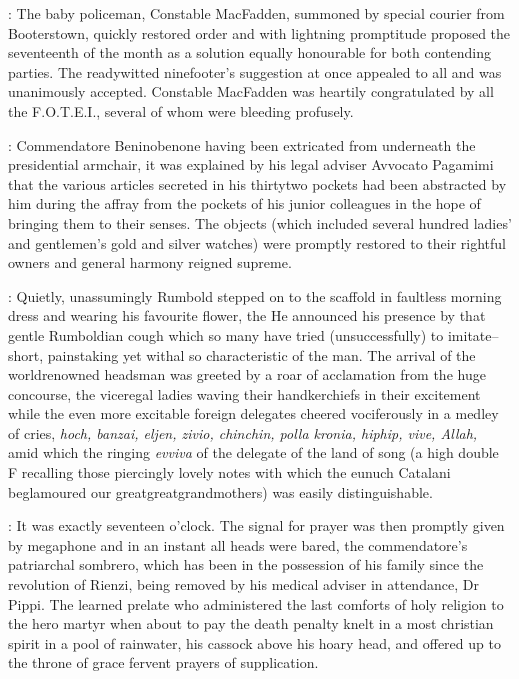 :
The baby policeman,
Constable MacFadden,
summoned by special courier from
Booterstown,
quickly restored order and with lightning promptitude
proposed the seventeenth of the month
as a solution equally honourable for
both contending parties.
The readywitted ninefooter's suggestion at once
appealed to all and was unanimously accepted.
Constable MacFadden was
heartily congratulated by all the F.O.T.E.I.,
several of whom were
bleeding profusely.

:
Commendatore Beninobenone having been extricated
from underneath the presidential armchair,
it was explained by his legal
adviser Avvocato Pagamimi that the various articles secreted in his
thirtytwo pockets had been abstracted by him during the affray from the
pockets of his junior colleagues in the hope of bringing them to their
senses.
The objects (which included several hundred ladies' and
gentlemen's gold and silver watches)
were promptly restored to their
rightful owners and general harmony reigned supreme.

:
Quietly,
unassumingly Rumbold stepped on to the scaffold in faultless
morning dress and wearing his favourite flower,
the 
He announced his presence by that gentle Rumboldian cough which so
many have tried (unsuccessfully) to imitate--short,
painstaking yet withal
so characteristic of the man.
The arrival of the worldrenowned headsman
was greeted by a roar of acclamation from the huge concourse,
the
viceregal ladies waving their handkerchiefs in their excitement while the
even more excitable foreign delegates cheered vociferously in a medley of
cries,
\emph{hoch,
banzai,
eljen,
zivio,
chinchin,
polla kronia,
hiphip,
vive,
Allah,} amid which the ringing \emph{evviva} of the delegate of the land of song
(a high double F recalling those piercingly lovely notes with which the
eunuch Catalani beglamoured our greatgreatgrandmothers) was easily
distinguishable.

:
It was exactly seventeen o'clock.
The signal for prayer
was then promptly given by megaphone and in an instant all heads were
bared,
the commendatore's patriarchal sombrero,
which has been in the
possession of his family since the revolution of Rienzi,
being removed by
his medical adviser in attendance,
Dr Pippi.
The learned prelate who
administered the last comforts of holy religion to the hero martyr when
about to pay the death penalty
knelt in a most christian spirit in a pool
of rainwater,
his cassock above his hoary head,
and offered up to the
throne of grace fervent prayers of supplication.

